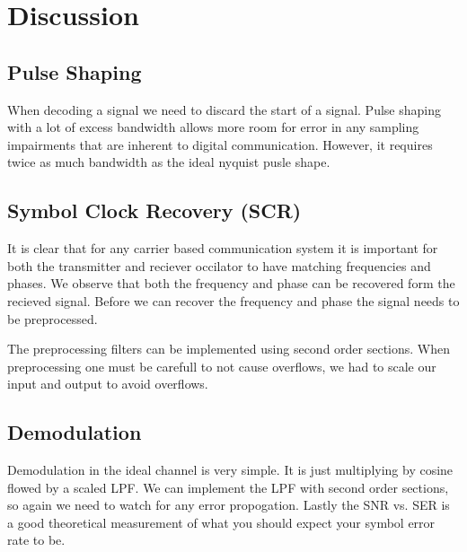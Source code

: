 \documentclass{article}
\begin{document}

\section{Discussion}

\subsection{Pulse Shaping}

When decoding a signal we need to discard the start of a signal.
Pulse shaping with a lot of excess bandwidth allows more room for error in any sampling impairments that are inherent to digital communication.
However, it requires twice as much bandwidth as the ideal nyquist pusle shape.

\subsection{Symbol Clock Recovery (SCR)}

It is clear that for any carrier based communication system it is important for both the transmitter and reciever occilator to have matching frequencies and phases.
We observe that both the frequency and phase can be recovered form the recieved signal.
Before we can recover the frequency and phase the signal needs to be preprocessed.

The preprocessing filters can be implemented using second order sections.
When preprocessing one must be carefull to not cause overflows, we had to scale our input and output to avoid overflows.

\subsection{Demodulation}

Demodulation in the ideal channel is very simple. It is just multiplying by cosine flowed by a scaled LPF.
We can implement the LPF with second order sections, so again we need to watch for any error propogation.
Lastly the SNR vs. SER is a good theoretical measurement of what you should expect your symbol error rate to be.

\end{document}
